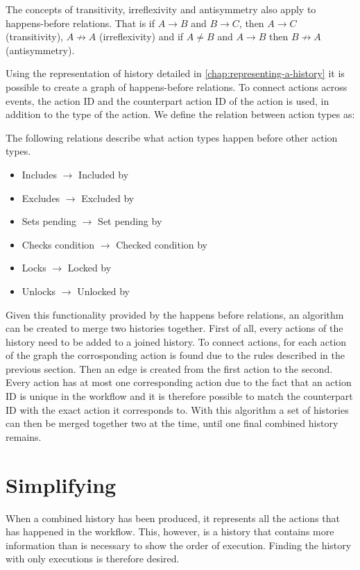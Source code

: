 	The concepts of transitivity, irreflexivity and antisymmetry also apply to happens-before relations. That is if $A \rightarrow B$ and $B \rightarrow C$, then $A \rightarrow C$ (transitivity), $A \not\rightarrow A$ (irreflexivity) and if $A \neq B$ and $A \rightarrow B$ then $B \not\rightarrow A$ (antisymmetry).
	
	\newpar Using the representation of history detailed in \autoref{chap:representing-a-history} it is possible to create a graph of happens-before relations. To connect actions across events, the action ID and the counterpart action ID of the action is used, in addition to the type of the action. We define the relation between action types as:
	
	\begin{definition}
		The following relations describe what action types happen before other action types.
			\begin{itemize}
				\item Includes $\rightarrow$ Included by
				\item Excludes $\rightarrow$ Excluded by
				\item Sets pending $\rightarrow$ Set pending by
				\item Checks condition $\rightarrow$ Checked condition by
				\item Locks $\rightarrow$ Locked by
				\item Unlocks $\rightarrow$ Unlocked by
			\end{itemize}
	\end{definition}
	
	Given this functionality provided by the happens before relations, an algorithm can be created to merge two histories together. First of all, every actions of the history need to be added to a joined history. To connect actions, for each action of the graph the corrosponding action is found due to the rules described in the previous section. Then an edge is created from the first action to the second. Every action has at most one corresponding action due to the fact that an action ID is unique in the workflow and it is therefore possible to match the counterpart ID with the exact action it corresponds to. With this algorithm a set of histories can then be merged together two at the time, until one final combined history remains.
	
	\section{Simplifying}
	When a combined history has been produced, it represents all the actions that has happened in the workflow. This, however, is a history that contains more information than is necessary to show the order of execution. Finding the history with only executions is therefore desired.
	
